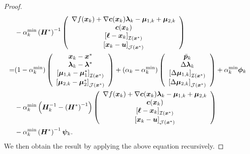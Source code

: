 \documentclass[aos]{imsart}
\numberwithin{equation}{section}
\theoremstyle{plain}
\begin{document}
\begin{appendix}
\begin{proof}
\begin{equation*}
\begin{split}
        & - \alpha_k^{\min} \left(\bm{H}^{*}\right)^{-1} \left( \begin{array}{c}
                 \nabla f(\bm{x}_k) + \nabla \bm{c}(\bm{x}_k) \bm{\lambda}_k - \bm{\mu}_{1,k} + \bm{\mu}_{2,k} \\
                 \bm{c}(\bm{x}_k)\\
                 \left[\bm{\ell} - \bm{x}_k \right]_{\mathcal{I}(\bm{x}^{*})}\\
                 \left[\bm{x}_k - \bm{u}\right]_{\mathcal{J}(\bm{x}^{*})}
            \end{array} \right) \\
        = & (1- \alpha_k^{\min}) \left( \begin{array}{c}
    \bm{x}_{k} - \bm{x}^{*}  \\
    \bm{\lambda}_{k} - \bm{\lambda}^{*} \\
    \left[ \bm{\mu}_{1,k} - \bm{\mu}_{1}^{*}\right]_{\mathcal{I}(\bm{x}^{*})} \\
    \left[ \bm{\mu}_{2,k} - \bm{\mu}_{2}^{*} \right]_{\mathcal{J}(\bm{x}^{*})} 
    \end{array} \right) + (\alpha_k - \alpha_k^{\min}) \left( \begin{array}{c}
        \Bar{\bm{p}}_k \\
        \Delta \bm{\lambda}_{k}\\
        \left[\Delta \bm{\mu}_{1,k} \right]_{\mathcal{I}(\bm{x}^{*})} \\
        \left[\Delta \bm{\mu}_{2,k} \right]_{\mathcal{J}(\bm{x}^{*})}
        \end{array} \right) + \alpha_k^{\min} \bm{\phi}_k \\
    & - \alpha_k^{\min} \left(\bm{H}_{k}^{-1} - \left(\bm{H}^{*}\right)^{-1} \right)\left( \begin{array}{c}
                 \nabla f(\bm{x}_k) + \nabla \bm{c}(\bm{x}_k) \bm{\lambda}_k - \bm{\mu}_{1,k} + \bm{\mu}_{2,k} \\
                 \bm{c}(\bm{x}_k)\\
                 \left[\bm{\ell} - \bm{x}_k \right]_{\mathcal{I}(\bm{x}^{*})}\\
                 \left[\bm{x}_k - \bm{u}\right]_{\mathcal{J}(\bm{x}^{*})}
            \end{array} \right) \\
    & - \alpha_k^{\min} \left(\bm{H}^{*}\right)^{-1} \bm{\psi}_k. 
        \end{split}
    \end{equation*}
    We then obtain the result by applying the above equation recursively.
\end{proof}




\end{appendix}
\end{document}

